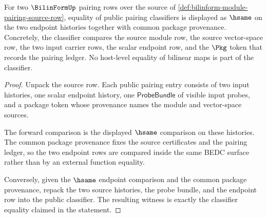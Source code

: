 \begin{theorem}
\label{thm:bilinform-pairing-classifier-row}
For two $\BilinFormUp$ pairing rows over the source of
\autoref{def:bilinform-module-pairing-source-row}, equality of public pairing
classifiers is displayed as $\hsame$ on the two endpoint histories together
with common package provenance. Concretely, the classifier compares the
source module row, the source vector-space row, the two input carrier rows,
the scalar endpoint row, and the $\Pkg$ token that records the pairing
ledger. No host-level equality of bilinear maps is part of the classifier.
\end{theorem}
\begin{proof}
Unpack the source row. Each public pairing entry consists of two input
histories, one scalar endpoint history, one $\mathsf{ProbeBundle}$ of visible
input probes, and a package token whose provenance names the module and
vector-space sources.

The forward comparison is the displayed $\hsame$ comparison on these
histories. The common package provenance fixes the source certificates and the
pairing ledger, so the two endpoint rows are compared inside the same BEDC
surface rather than by an external function equality.

Conversely, given the $\hsame$ endpoint comparison and the common package
provenance, repack the two source histories, the probe bundle, and the
endpoint row into the public classifier. The resulting witness is exactly the
classifier equality claimed in the statement.
\end{proof}

